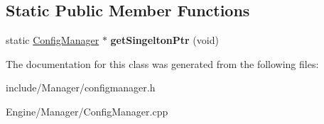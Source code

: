 \subsection*{Static Public Member Functions}
\begin{DoxyCompactItemize}
\item 
\hypertarget{classEngine_1_1ConfigManager_ad5bf04a62c7b408a902a6a933b7ce7de}{}static \hyperlink{classEngine_1_1ConfigManager}{Config\+Manager} $\ast$ {\bfseries get\+Singelton\+Ptr} (void)\label{classEngine_1_1ConfigManager_ad5bf04a62c7b408a902a6a933b7ce7de}

\end{DoxyCompactItemize}


The documentation for this class was generated from the following files\+:\begin{DoxyCompactItemize}
\item 
include/\+Manager/configmanager.\+h\item 
Engine/\+Manager/Config\+Manager.\+cpp\end{DoxyCompactItemize}
